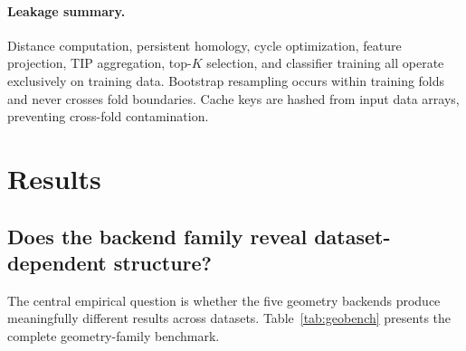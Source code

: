 \documentclass[11pt]{article}
\begin{document}
\paragraph{Leakage summary.}
Distance computation, persistent homology, cycle optimization, feature projection, TIP aggregation, top-$K$ selection, and classifier training all operate exclusively on training data.
Bootstrap resampling occurs within training folds and never crosses fold boundaries.
Cache keys are hashed from input data arrays, preventing cross-fold contamination.

\section{Results}
\label{sec:results}

\subsection{Does the backend family reveal dataset-dependent structure?}

The central empirical question is whether the five geometry backends produce meaningfully different results across datasets.
Table~\ref{tab:geobench} presents the complete geometry-family benchmark.
\end{document}
